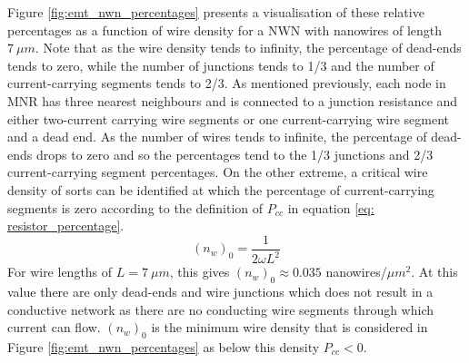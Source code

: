 Figure \ref{fig:emt_nwn_percentages} presents a visualisation of these relative percentages as a function of wire density for a NWN with nanowires of length $7 ~ \mu m$. Note that as the wire density tends to infinity, the percentage of dead-ends tends to zero, while the number of junctions tends to 1/3 and the number of current-carrying segments tends to 2/3. As mentioned previously, each node in MNR has three nearest neighbours and is connected to a junction resistance and either two-current carrying wire segments or one current-carrying wire segment and a dead end. As the number of wires tends to infinite, the percentage of dead-ends drops to zero and so the percentages tend to the 1/3 junctions and 2/3 current-carrying segment percentages. On the other extreme, a critical wire density of sorts can be identified at which the percentage of current-carrying segments is zero according to the definition of $P_{cc}$ in equation \ref{eq: resistor_percentage}.
\begin{equation}
(n_w)_0 = \frac{1}{2 \omega L^2}
\end{equation}
For wire lengths of $L = 7 ~ \mu m$, this gives $(n_w)_0 \approx 0.035$ nanowires/$\mu m^2$. At this value there are only dead-ends and wire junctions which does not result in a conductive network as there are no conducting wire segments through which current can flow. $(n_w)_0$ is the minimum wire density that is considered in Figure \ref{fig:emt_nwn_percentages} as below this density $P_{cc}<0$.

